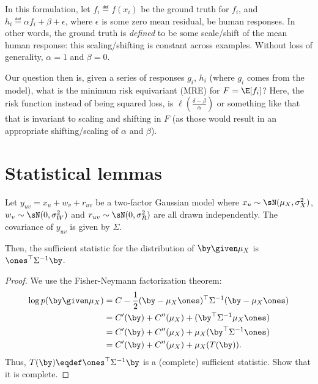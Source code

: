 In this formulation, let $f_i \eqdef f(x_i)$ be the ground truth for $f_i$, and $h_i \eqdef \alpha f_i + \beta + \epsilon$, where $\epsilon$ is some zero mean residual, be human responses.
In other words, the ground truth is \textit{defined} to be some scale/shift of the mean human response: this scaling/shifting is constant across examples.
Without loss of generality, $\alpha = 1$ and $\beta = 0$.

Our question then is, given a series of responses $g_i$, $h_i$ (where $g_i$ comes from the model), what is the minimum risk equivariant (MRE) for $F = \E[f_i]$?
Here, the risk function instead of being squared loss, is $\ell(\frac{\delta - \beta}{\alpha})$ or something like that that is invariant to scaling and shifting in $F$ (as those would result in an appropriate shifting/scaling of $\alpha$ and $\beta$).

\section{Statistical lemmas}

\begin{lemma}%
\label{lem:suff-stats-two-factor}
  Let $y_{uv} = x_u + w_v + r_{uv}$ be a two-factor Gaussian model where $x_u \sim \sN(\mu_X, \sigma_X^2)$, $w_v \sim \sN(0, \sigma_W^2)$ and $r_{uv} \sim \sN(0, \sigma_{R}^2)$ are all drawn independently.
  The covariance of $y_{uv}$ is given by $\Sigma$. 

  Then, the sufficient statistic for the distribution of $\by \given \mu_X$ is $\ones^\top\Sigma^{-1} \by$.
\end{lemma}
\begin{proof}
  We use the Fisher-Neymann factorization theorem:
  \begin{align*}
  \log p(\by \given \mu_X) 
      &= C - \frac{1}{2} (\by - \mu_X \ones)^\top \Sigma^{-1}  (\by - \mu_X \ones) \\
      &= C'(\by) + C''(\mu_X) + (\by^\top \Sigma^{-1} \mu_X \ones) \\
      &= C'(\by) + C''(\mu_X) + \mu_X (\by^\top \Sigma^{-1} \ones) \\
      &= C'(\by) + C''(\mu_X) + \mu_X (T(\by)).
  \end{align*}
  Thus, $T(\by) \eqdef \ones^\top\Sigma^{-1} \by$ is a (complete) sufficient statistic.
  \ac{Show that it is complete.}
\end{proof}

